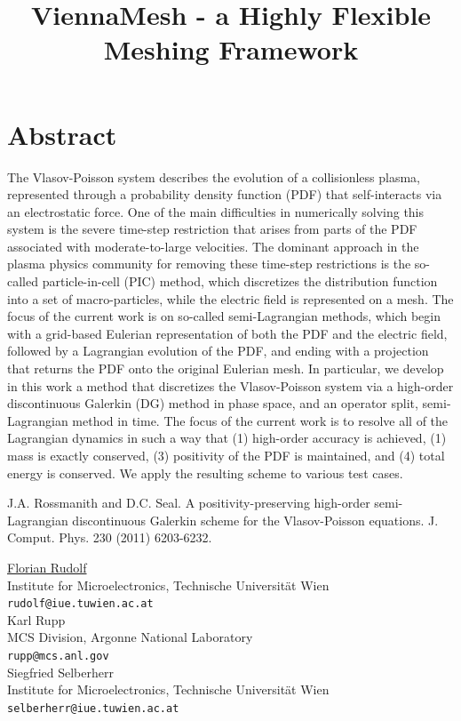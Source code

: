 \documentclass[article,A4,11pt]{llncs}%
\begin{document}
\section*{Abstract}
The Vlasov-Poisson system describes the evolution of a collisionless plasma, represented through a probability density function (PDF) that self-interacts via an electrostatic force. One of the main difficulties in numerically solving this system is the severe time-step restriction that arises from parts of the PDF associated with moderate-to-large velocities. The dominant approach in the plasma physics community for removing these time-step restrictions is the so-called particle-in-cell (PIC) method, which discretizes the distribution function into a set of macro-particles, while the electric field is represented on a mesh. The focus of the current work is on so-called semi-Lagrangian methods, which begin with a grid-based Eulerian representation of both the PDF and the electric field, followed by a Lagrangian evolution of the PDF, and ending with a projection that returns the PDF onto the original Eulerian mesh. In particular, we develop in this work a method that discretizes the Vlasov-Poisson system via a high-order discontinuous Galerkin (DG) method in phase space, and an operator split, semi-Lagrangian method in time. The focus of the current work is to resolve all of the Lagrangian dynamics in such a way that (1) high-order accuracy is achieved, (1) mass is exactly conserved, (3) positivity of the PDF is maintained, and (4) total energy is conserved. We apply the resulting scheme to various test cases.


\begin{thebibliography}{10}
{\sc J.A. Rossmanith and D.C. Seal}. { A positivity-preserving high-order semi-Lagrangian discontinuous Galerkin scheme for the Vlasov-Poisson equations}. J. Comput. Phys. 230 (2011) 6203-6232.
\end{thebibliography}

\title{ViennaMesh - a Highly Flexible Meshing Framework}
 \author{} \institute{}
\maketitle
\begin{center}
{\large \underline{Florian Rudolf}}\\
Institute for Microelectronics, Technische Universität Wien\\
{\tt rudolf@iue.tuwien.ac.at}
\\ \vspace{4mm}
{\large Karl Rupp}\\
MCS Division, Argonne National Laboratory\\
{\tt rupp@mcs.anl.gov}
\\ \vspace{4mm}
{\large Siegfried Selberherr}\\
Institute for Microelectronics, Technische Universität Wien\\
{\tt selberherr@iue.tuwien.ac.at}
\end{center}
\end{document}
